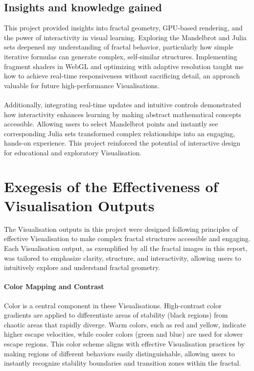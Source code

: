 \documentclass[12pt,a4paper]{report}
\begin{document}
\subsection{Insights and knowledge gained}
This project provided insights into fractal geometry, GPU-based rendering, and the power of interactivity in visual learning. Exploring the Mandelbrot and Julia sets deepened my understanding of fractal behavior, particularly how simple iterative formulas can generate complex, self-similar structures. Implementing fragment shaders in WebGL and optimizing with adaptive resolution taught me how to achieve real-time responsiveness without sacrificing detail, an approach valuable for future high-performance Visualisations.
\\\\
Additionally, integrating real-time updates and intuitive controls demonstrated how interactivity enhances learning by making abstract mathematical concepts accessible. Allowing users to select Mandelbrot points and instantly see corresponding Julia sets transformed complex relationships into an engaging, hands-on experience. This project reinforced the potential of interactive design for educational and exploratory Visualisation. 

\section{Exegesis of the Effectiveness of Visualisation Outputs}
The Visualisation outputs in this project were designed following principles of effective Visualisation to make complex fractal structures accessible and engaging. Each Visualisation output, as exemplified by all the fractal images in this report, was tailored to emphasize clarity, structure, and interactivity, allowing users to intuitively explore and understand fractal geometry.

\paragraph{Color Mapping and Contrast} 
Color is a central component in these Visualisations. High-contrast color gradients are applied to differentiate areas of stability (black regions) from chaotic areas that rapidly diverge. Warm colors, such as red and yellow, indicate higher escape velocities, while cooler colors (green and blue) are used for slower escape regions. This color scheme aligns with effective Visualisation practices by making regions of different behaviors easily distinguishable, allowing users to instantly recognize stability boundaries and transition zones within the fractal. 
\end{document}
